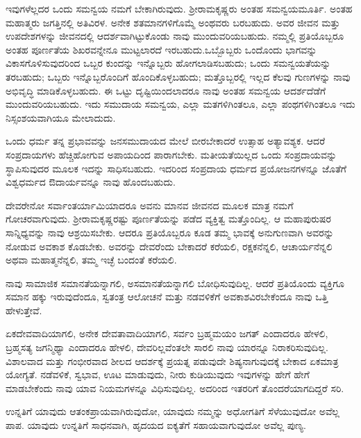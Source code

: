 ಇವುಗಳೆಲ್ಲದರ ಒಂದು ಸಮನ್ವಯ ನಮಗೆ ಬೇಕಾಗಿರುವುದು. ಶ‍್ರೀರಾಮಕೃಷ್ಣರು ಅಂತಹ ಸಮನ್ವಯಮೂರ್ತಿ. ಅಂತಹ ಮಹಾತ್ಮರು ಜಗತ್ತಿನಲ್ಲಿ ಅತಿವಿರಳ. ಅನೇಕ ಶತಮಾನಗಳಿಗೊಮ್ಮೆ ಅಂಥವರು ಬರಬಹುದು. ಅವರ ಜೀವನ ಮತ್ತು ಉಪದೇಶಗಳನ್ನು ಜೀವನದಲ್ಲಿ ಆದರ್ಶವಾಗಿಟ್ಟುಕೊಂಡು ನಾವು ಮುಂದುವರಿಯಬಹುದು. ನಮ್ಮಲ್ಲಿ ಪ್ರತಿಯೊಬ್ಬರೂ ಅಂತಹ ಪೂರ್ಣತೆಯ ಶಿಖರವನ್ನೇನೂ ಮುಟ್ಟಲಾರದೆ ಇರಬಹುದು.\break ಒಬ್ಬೊಬ್ಬರು ಒಂದೊಂದು ಭಾಗವನ್ನು ವಿಕಾಸಗೊಳಿಸುವುದರಿಂದ ಒಬ್ಬರ ಕುಂದನ್ನು ಇನ್ನೊಬ್ಬರು ಹೋಗಲಾಡಿಸಬಹುದು; ಒಂದು ಸಮನ್ವಯತೆಯನ್ನು ತರಬಹುದು; ಒಬ್ಬರು ಇನ್ನೊಬ್ಬರೊಂದಿಗೆ ಹೊಂದಿಕೊಳ್ಳಬಹುದು; ಮತ್ತೊಬ್ಬರಲ್ಲಿ ಇಲ್ಲದ ಕೆಲವು ಗುಣಗಳನ್ನು ನಾವು ಅಭಿವೃದ್ಧಿ ಮಾಡಿಕೊಳ್ಳಬಹುದು. ಈ ಒಟ್ಟು ದೃಷ್ಟಿಯಿಂದಲಾದರೂ ನಾವು ಅಂತಹ ಸಮನ್ವಯ ಆದರ್ಶದೆಡೆಗೆ ಮುಂದುವರಿಯಬಹುದು. ಇದು ಸಮುದಾಯ ಸಮನ್ವಯ, ಎಲ್ಲಾ ಮತಗಳಿಗಿಂತಲೂ, ಎಲ್ಲಾ ಪಂಥಗಳಿಗಿಂತಲೂ ಇದು ನಿಸ್ಸಂಶಯವಾಗಿಯೂ ಮೇಲಾದುದು.

\vspace{0.2cm}

ಒಂದು ಧರ್ಮ ತನ್ನ ಪ್ರಭಾವವನ್ನು ಜನಸಮುದಾಯದ ಮೇಲೆ ಬೀರಬೇಕಾದರೆ ಉತ್ಸಾಹ ಅತ್ಯಾವಶ್ಯಕ. ಆದರೆ ಸಂಪ್ರದಾಯಗಳು ಹೆಚ್ಚಿಹೋಗುವ ಅಪಾಯದಿಂದ ಪಾರಾಗಬೇಕು. ಮತೀಯತೆಯಿಲ್ಲದ ಒಂದು ಸಂಪ್ರದಾಯವನ್ನು ಸ್ಥಾಪಿಸುವುದರ ಮೂಲಕ ಇದನ್ನು ಸಾಧಿಸಬಹುದು. ಇದರಿಂದ ಸಂಪ್ರದಾಯ ಧರ್ಮದ ಪ್ರಯೋಜನಗಳನ್ನೂ ಜೊತೆಗೆ ವಿಶ್ವಧರ್ಮದ ಔದಾರ್ಯವನ್ನೂ ನಾವು ಹೊಂದಬಹುದು.

\newpage

ದೇವರೇನೋ ಸರ್ವಾಂತರ್ಯಾಮಿಯಾದರೂ ಅವನು ಮಾನವ ಜೀವನದ ಮೂಲಕ ಮಾತ್ರ ನಮಗೆ ಗೋಚರವಾಗುವುದು. ಶ‍್ರೀರಾಮಕೃಷ್ಣರಷ್ಟು ಪೂರ್ಣತೆಯನ್ನು ಪಡೆದ ವ್ಯಕ್ತಿತ್ವ ಮತ್ತೊಂದಿಲ್ಲ. ಆ ಮಹಾಪುರುಷರ ಸಾನ್ನಿಧ್ಯವನ್ನು ನಾವು ಆಶ್ರಯಿಸಬೇಕು. ಆದರೂ ಪ್ರತಿಯೊಬ್ಬರೂ ಕೂಡ ತಮ್ಮ ಭಾವಕ್ಕೆ ಅನುಗುಣವಾಗಿ ಅವರನ್ನು ನೋಡುವ ಅವಕಾಶ ಕೊಡಬೇಕು. ಅವರನ್ನು ದೇವರೆಂದು ಬೇಕಾದರೆ ಕರೆಯಲಿ, ರಕ್ಷಕನೆನ್ನಲಿ, ಆಚಾರ್ಯನೆನ್ನಲಿ ಅಥವಾ ಮಹಾತ್ಮನೆನ್ನಲಿ, ತಮ್ಮ ಇಚ್ಛೆ ಬಂದಂತೆ ಕರೆಯಲಿ.

\vspace{0.2cm}

ನಾವು ಸಾಮಾಜಿಕ ಸಮಾನತೆಯನ್ನಾಗಲಿ, ಅಸಮಾನತೆಯನ್ನಾಗಲಿ ಬೋಧಿಸುವುದಿಲ್ಲ. ಆದರೆ ಪ್ರತಿಯೊಂದು ವ್ಯಕ್ತಿಗೂ ಸಮಾನ ಹಕ್ಕು ಇರುವುದೆಂದೂ, ಸ್ವತಂತ್ರ ಆಲೋಚನೆ ಮತ್ತು ನಡವಳಿಕೆಗೆ ಅವಕಾಶವಿರಬೇಕೆಂದೂ ನಾವು ಒತ್ತಿ ಹೇಳುತ್ತೇವೆ.

\vspace{0.2cm}

ಏಕದೇವವಾದಿಯಾಗಲಿ, ಅನೇಕ ದೇವತಾವಾದಿಯಾಗಲಿ, ಸರ್ವಂ ಬ್ರಹ್ಮಮಯಂ ಜಗತ್ ಎಂದಾದರೂ ಹೇಳಲಿ, ಬ್ರಹ್ಮಸತ್ಯ ಜಗನ್ಮಿಥ್ಯಾ ಎಂದಾದರೂ ಹೇಳಲಿ, ದೇವರಿಲ್ಲವೆಂತಲೇ ಸಾರಲಿ \enginline{-} ನಾವು ಯಾರನ್ನೂ ನಿರಾಕರಿಸುವುದಿಲ್ಲ. ವಿಶಾಲವಾದ ಮತ್ತು ಗಂಭೀರವಾದ ಶೀಲದ ಆದರ್ಶಕ್ಕೆ ಪ್ರಯತ್ನ ಪಡುವುದೇ ಶಿಷ್ಯನಾಗುವುದಕ್ಕೆ ಬೇಕಾದ ಏಕಮಾತ್ರ ಯೋಗ್ಯತೆ. ನಡೆವಳಿಕೆ, ಸ್ವಭಾವ, ಊಟ ಮಾಡುವುದು, ನೀರು ಕುಡಿಯುವುದು ಇವುಗಳನ್ನು ಹೇಗೆ ಹೇಗೆ ಮಾಡಬೇಕೆಂದು ನಾವು ಯಾವ ನಿಯಮಗಳನ್ನೂ ವಿಧಿಸುವುದಿಲ್ಲ. ಅದರಿಂದ ಇತರರಿಗೆ ತೊಂದರೆಯಾಗದಿದ್ದರೆ ಸರಿ.

\vspace{0.2cm}

ಉನ್ನತಿಗೆ ಯಾವುದು ಆತಂಕಪ್ರಾಯವಾಗಿರುವುದೋ, ಯಾವುದು ನಮ್ಮನ್ನು ಅಧೋಗತಿಗೆ ಸೆಳೆಯುವುದೋ ಅವೆಲ್ಲ ಪಾಪ. ಯಾವುದು ಉನ್ನತಿಗೆ ಸಾಧನವಾಗಿ, ಹೃದಯದ ಐಕ್ಯತೆಗೆ ಸಹಾಯವಾಗುವುದೋ ಅವೆಲ್ಲ ಪುಣ್ಯ.

